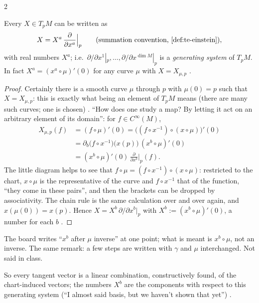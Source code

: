 \begin{paracol}{2}
\begin{proposition}\label{prop:tv-generate}
Every $X\in T_pM$ can be written as
\[
  X=X^a\,\frac{\partial}{\partial x^a}\Bigr|_p\qquad(\text{summation convention, \cref{def:te-einstein}}),
\]
with real numbers $X^a$; i.e.\ $\partial/\partial x^1|_p,\dots,\partial/\partial x^{\dim M}|_p$ is a \emph{generating system} of $T_pM$. In fact $X^a=(x^a\circ\mu)'(0)$ for any curve $\mu$ with $X=X_{\mu,p}$     .
\end{proposition}
\begin{proof}
Certainly there is a smooth curve $\mu$ through $p$ with $\mu(0)=p$ such that $X=X_{\mu,p}$: this is exactly what being an element of $T_pM$ means (there are many such curves; one is chosen)    .
``How does one study a map? By letting it act on an arbitrary element of its domain'': for $f\in C^\infty(M)$,
\begin{align*}
X_{\mu,p}(f)&=(f\circ\mu)'(0)=\bigl((f\circ x^{-1})\circ(x\circ\mu)\bigr)'(0)\\
&=\partial_b\bigl(f\circ x^{-1}\bigr)\bigl(x(p)\bigr)\,(x^b\circ\mu)'(0)\\
&=(x^b\circ\mu)'(0)\,\frac{\partial}{\partial x^b}\Bigr|_p(f).
\end{align*}
The little diagram helps to see that $f\circ\mu=(f\circ x^{-1})\circ(x\circ\mu)$: restricted to the chart, $x\circ\mu$ is the representative of the curve and $f\circ x^{-1}$ that of the function, ``they come in these pairs'', and then the brackets can be dropped by associativity. The chain rule is the same calculation over and over again, and
$x(\mu(0))=x(p)$. Hence $X=X^b\,\partial/\partial x^b|_p$ with $X^b:=(x^b\circ\mu)'(0)$, a number for each $b$      .
\end{proof}
\begin{coursenote}
The board writes ``$x^b$ after $\mu$ inverse'' at one point; what is meant is $x^b\circ\mu$, not an inverse. The same remark: a few steps are written with $\gamma$ and $\mu$ interchanged. Not said in class.
\end{coursenote}
So every tangent vector is a linear combination, constructively found, of the chart-induced vectors; the numbers $X^b$ are the components with respect to this generating system (``I almost said basis, but we haven't shown that yet'')  .

\end{paracol}
